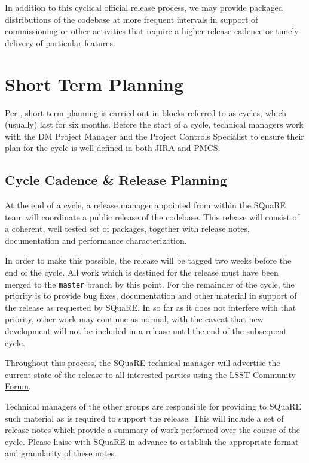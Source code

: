 In addition to this cyclical official release process, we may provide
packaged distributions of the codebase at more frequent intervals in
support of commissioning or other activities that require a higher
release cadence or timely delivery of particular features.

\section{Short Term Planning}
\label{sec:cycle-plan}

Per , short term planning is carried out in blocks referred to as cycles, which (usually) last for six months.
Before the start of a cycle, technical managers work with the DM Project Manager and the Project Controls Specialist to ensure their plan for the cycle is well defined in both JIRA and PMCS.

\subsection{Cycle Cadence \& Release Planning}
\label{sec:cycle-cadence}

At the end of a cycle, a release manager appointed from within the
SQuaRE team will coordinate a public release of the codebase. This
release will consist of a coherent, well tested set of packages,
together with release notes, documentation and performance
characterization.

In order to make this possible, the release will be tagged two weeks
before the end of the cycle. All work which is destined for the release
must have been merged to the \texttt{master} branch by this point. For
the remainder of the cycle, the priority is to provide bug fixes,
documentation and other material in support of the release as requested
by SQuaRE. In so far as it does not interfere with that priority, other
work may continue as normal, with the caveat that new development will
not be included in a release until the end of the subsequent cycle.

Throughout this process, the SQuaRE technical manager will advertise the
current state of the release to all interested parties using the
\href{https://community.lsst.org/}{LSST Community Forum}.

Technical managers of the other groups are responsible for providing to
SQuaRE such material as is required to support the release. This will
include a set of release notes which provide a summary of work performed
over the course of the cycle. Please liaise with SQuaRE in advance to
establish the appropriate format and granularity of these notes.

